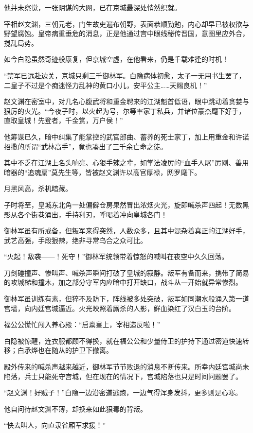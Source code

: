 他并未察觉，一张阴谋的大网，已在京城最深处悄然织就。

宰相赵文渊，三朝元老，门生故吏遍布朝野，表面恭顺勤勉，内心却早已被权欲与野望腐蚀。皇帝病重垂危的消息，正是他通过宫中眼线秘传晋国，意图里应外合，搅乱局势。

如今白隐虽然奇迹般康复，但京城空虚，在他看来，仍是千载难逢的时机！

“禁军已远赴边关，京城只剩三千御林军。白隐病体初愈，太子一无用书生罢了，二皇子不过是个痴迷怪力乱神的黄口小儿，安平公主……天赐良机！”

赵文渊在密室中，对几名心腹武将和重金聘来的江湖魁首低语，眼中跳动着贪婪与狠厉的火光。“今夜子时，以火起为号，尔等率家丁私兵，并诸位豪杰麾下好手，直取皇城！先登者，千金赏，万户侯！”

他筹谋已久，暗中纠集了能掌控的武官部曲、蓄养的死士家丁，加上用重金和许诺招揽的所谓“武林高手”，竟也凑出了三千余亡命之徒。

其中不乏在江湖上名头响亮、心狠手辣之辈，如掌法凌厉的“血手人屠”厉刚、善用暗器的“追魂扇”莫先生等，皆被赵文渊许以高官厚禄，网罗麾下。

月黑风高，杀机暗藏。

子时将至，皇城东北角一处偏僻仓房果然冒出浓烟火光，旋即喊杀声四起！无数黑影从各个街巷涌出，手持利刃，呼喝着冲向皇城各门！

御林军虽有所戒备，但叛军来得突然，人数众多，且其中混杂着真正的江湖好手，武艺高强，手段狠辣，绝非寻常乌合之众可比。

“火起！敌袭——！死守！”御林军统领带着惊怒的喊叫在夜空中久久回荡。

刀剑碰撞声、惨叫声、喊杀声瞬间打破了皇城的寂静。叛军有备而来，携带了简易的攻城梯和撞木，加之部分守军内应暗中打开缺口，战斗从一开始就异常惨烈。

御林军虽训练有素，但猝不及防下，阵线被多处突破，叛军如同潮水般涌入第一道宫墙，向内廷宫城逼近。火光映照着厮杀的人影，鲜血染红了汉白玉的台阶。

福公公慌忙闯入养心殿：“启禀皇上，宰相造反啦！”

白隐被惊醒，连衣服都顾不得换，就在福公公和少量侍卫的护持下通过密道快速转移；白承烨也在随从的护卫下撤离。

殿外传来的喊杀声越来越近，御林军节节败退的消息不断传来。所幸内廷宫城尚未陷落，兵士只能死守宫城，但在现在的情况下，宫城陷落也只是时间问题罢了。

“赵文渊！好贼子！”白隐一边沿密道逃跑，一边气得浑身发抖，更多则是心寒。

他自问待赵文渊不薄，却换来如此狠毒的背叛。

“快去叫人，向直隶省厢军求援！”

